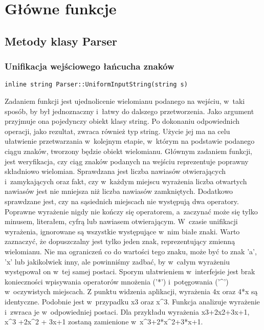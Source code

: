 \section{Główne funkcje}

\subsection{Metody klasy Parser}

\subsubsection{Unifikacja wejściowego łańcucha znaków}
\begin{lstlisting}
inline string Parser::UniformInputString(string s)
\end{lstlisting}

Zadaniem funkcji jest ujednolicenie wielomianu podanego na wejściu, w~taki sposób, by był jednoznaczny i~łatwy do dalszego przetworzenia. Jako argument przyjmuje ona pojedynczy obiekt klasy string. Po dokonaniu odpowiednich operacji, jako rezultat, zwraca również typ string. Użycie jej ma na celu ułatwienie przetwarzania w~kolejnym etapie, w~którym na podstawie podanego ciągu znaków, tworzony będzie obiekt wielomianu. Głównym zadaniem funkcji, jest weryfikacja, czy ciąg znaków podanych na wejściu reprezentuje poprawny składniowo wielomian. Sprawdzana jest liczba nawiasów otwierających i~zamykających oraz fakt, czy w~każdym miejscu wyrażenia liczba otwartych nawiasów jest nie mniejsza niż liczba nawiasów zamkniętych. Dodatkowo sprawdzane jest, czy na sąsiednich miejscach nie występują dwa operatory. Poprawne wyrażenie nigdy nie kończy się operatorem, a~zaczynać może się tylko minusem, literałem, cyfrą lub nawiasem otwierającym. W~czasie unifikacji wyrażenia, ignorowane są wszystkie występujące w~nim białe znaki. Warto zaznaczyć, że dopuszczalny jest tylko jeden znak, reprezentujący zmienną wielomianu. Nie ma ograniczeń co do wartości tego znaku, może być to znak 'a', 'x' lub jakikolwiek inny, ale powinniśmy zadbać, by w~całym wyrażeniu występował on w~tej samej postaci. Sporym ułatwieniem w~interfejsie jest brak konieczności wpisywania operatorów mnożenia ('*') i~potęgowania ('\^{}') w~oczywistych miejscach. Z punktu widzenia aplikacji, wyrażenia 4x oraz 4*x są identyczne. Podobnie jest w~przypadku x3 oraz x\^{}3. Funkcja analizuje wyrażenie i~zwraca je w~odpowiedniej postaci. Dla przykładu wyrażenia x3+2x2+3x+1, x\^{}3 +2x\^{}2 + 3x+1 zostaną zamienione w~x\^{}3+2*x\^{}2+3*x+1.

